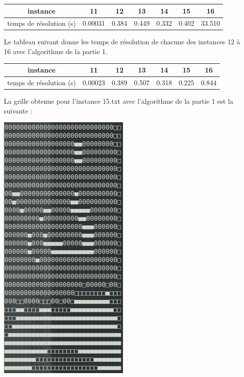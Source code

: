 \documentclass[12pt]{article}
\begin{document}
				\begin{center}
					\begin{tabular}{|c|c|c|c|c|c|c| }
						\hline
						instance & 11 & 12 & 13 & 14 & 15 & 16 \\ \hline
						temps de résolution (s) & 0.00031 & 0.384 & 0.449 & 0.332 & 0.402 & 33.510 \\ \hline
					\end{tabular}
				\end{center}
			
				Le tableau suivant donne les temps de résolution de chacune des instances 12 à 16 avec l'algorithme de la partie 1.
				\begin{center}
					\begin{tabular}{|c|c|c|c|c|c|c| }
						\hline
						instance & 11 & 12 & 13 & 14 & 15 & 16 \\ \hline
						temps de résolution (s) & 0.00023 & 0.389 & 0.507 & 0.318 & 0.225 & 0.844 \\ \hline
					\end{tabular}
				\end{center}
				
				La grille obtenue pour l'instance 15.txt avec l'algorithme de la partie 1 est la suivante :
				\begin{center}
					\includegraphics[scale=0.4]{instance15-1.png}
				\end{center}
			
\end{document}
